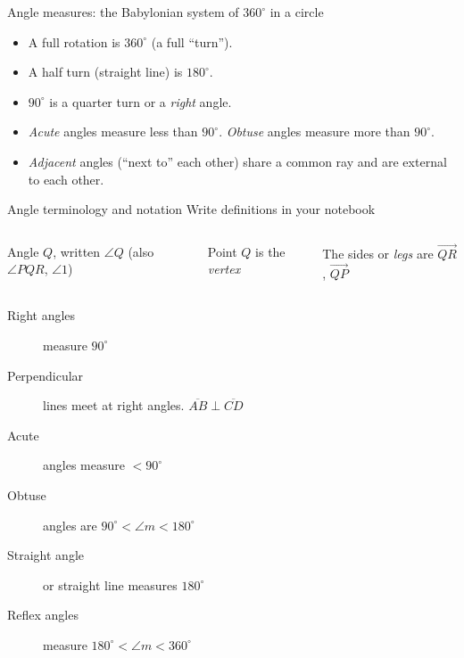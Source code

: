 \begin{frame}{Angle measures: the Babylonian system of $360^\circ$ in a circle}
    \begin{itemize}
      \item A full rotation is $360^\circ$ (a full ``turn'').
      \item A half turn (straight line) is $180^\circ$.
      \item $90^\circ$ is a quarter turn or a \emph{right} angle.
      \item \emph{Acute} angles measure less than $90^\circ$. \emph{Obtuse} angles measure more than $90^\circ$.
      \item \emph{Adjacent} angles (``next to'' each other) share a common ray and are external to each other.
    \end{itemize}
  \begin{center}
    \end{center}
\end{frame}

\begin{frame}{Angle terminology and notation}
  {Write definitions in your notebook}
  \begin{columns}
    Angle $Q$, written $\angle Q$ (also $\angle PQR$, $\angle 1$) \par \medskip
    Point $Q$ is the \emph{vertex} \par \medskip
    The sides or \emph{legs} are $\overrightarrow{QR}$, $\overrightarrow{QP}$  \par \medskip
      
  \end{columns}
  \begin{description}
    \item[Right angles] measure $90^\circ$
    \item[Perpendicular] lines meet at right angles. $\overline{AB} \perp \overline{CD}$
    \item[Acute] angles measure $< 90^\circ$
    \item[Obtuse] angles are $90^\circ < \angle m < 180^\circ$
    \item[Straight angle]  or straight line  measures $180^\circ$
    \item[Reflex angles]  measure $180^\circ < \angle m < 360^\circ$
  \end{description}
  \end{frame}

